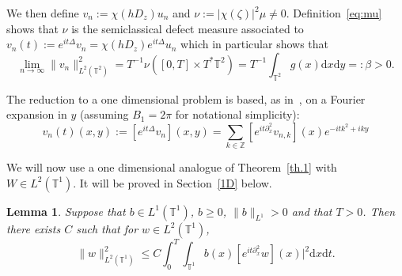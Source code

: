 \documentclass[10pt]{amsart}
\newtheorem{lemm}[theo]{Lemma}\newtheorem{prop}[theo]{Proposition}\newtheorem{coro}[theo]{Corollary}\newtheorem{conj}[theo]{Conjecture}
\theoremstyle{definition}\newtheorem{defi}[theo]{Definition}\newtheorem{rema}[theo]{Remark}\newtheorem{exam}[theo]{Example}\newtheorem{exem}[theo]{Example}\newtheorem{nota}[theo]{Notation}
\newcommand{\TT}{{\mathbb T}}
\newcommand{\ZZ}{{\mathbb Z}}
\newcommand*{\dd}{\mathrm{d}}
\newcommand*{\dx}{\dd x}
\newcommand*{\dy}{\dd y}
\newcommand*{\dt}{\dd t}
\begin{document}
We then define $ v_n := \chi (h D_z) u_n $ and $\nu := |\chi (\zeta)|^2 \mu \neq 0 $. Definition~\eqref{eq:mu} shows that $ \nu $ is the semiclassical defect measure associated to $ v_n (t) := e^{ i t \Delta } v_n = \chi (h D_z) e^{ it \Delta } u_n $ which in particular shows that
\begin{equation}\label{eq:beta}
\lim_{n\to \infty} \| v_n \|_{ L^2 (\TT^2) }^2 = T^{-1} \nu ([0, T] \times T^* \TT^2) = T^{-1} \int_{ \TT^2 } g (x) \dx \dy =: \beta > 0.
\end{equation}

The reduction to a one dimensional problem is based, as in~\cite{BZ4}, on a Fourier expansion in $ y $ (assuming $ B_1 = 2 \pi $ for notational simplicity):
\begin{equation}\label{eq:Four}
v_n (t) (x, y) := [e^{ i t \Delta } v_n] (x, y) =
\sum_{ k \in \ZZ } [e^{ i t \partial_x^2 } v_{n, k }] (x) e^{-it k^2 + i ky }
\end{equation}

We will now use a one dimensional analogue of Theorem~\ref{th.1} with $ W \in L^2 (\TT^1) $. It will be proved in Section~\ref{1D} below.
\begin{lemm}\label{l:3}
Suppose that $ b \in L^1 (\TT^1) $, $ b\geq 0 $, $\| b \|_{ L^1 } > 0 $ and that $ T > 0 $. Then there exists $ C $ such that for $ w \in L^2 (\TT^1) $,
\begin{equation}\label{eq:l3}
\| w \|_{L^2 (\TT^1) }^2 \leq C \int_0^T \int_{\TT^1} b (x) [e^{ i t \partial_x^2} w](x)|^2 \dx \dt.
\end{equation}
\end{lemm}
\end{document}
